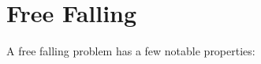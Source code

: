 \documentclass[12pt, letterpaper]{article}
\begin{document}
\newpage

\noindent\section{Free Falling}

\newcommand{\makeboxlabel}[1]{\fbox{#1.}\hfill}%
\newenvironment{boxlabel}
  {\begin{list}
    {\arabic{boxlblcounter}}
    {\usecounter{boxlblcounter}
     \setlength{\labelwidth}{3em}
     \setlength{\labelsep}{0em}
     \setlength{\itemsep}{2pt}
     \setlength{\leftmargin}{1.5cm}
     \setlength{\rightmargin}{2cm}
     \setlength{\itemindent}{0em} 
     \let\makelabel=\makeboxlabel
    }
  }
{\end{list}}

\noindent A free falling problem has a few notable properties:
\end{document}
